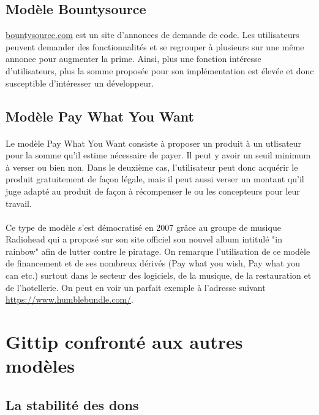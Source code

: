     \subsection{Modèle Bountysource}

\url{bountysource.com} est un site d'annonces de demande de code. Les
utilisateurs peuvent demander des fonctionnalités et se regrouper à plusieurs
sur une même annonce pour augmenter la prime. Ainsi, plus une fonction
intéresse d'utilisateurs, plus la somme proposée pour son implémentation est
élevée et donc susceptible d'intéresser un développeur.

    \subsection{Modèle Pay What You Want}
    
    \paragraph{} Le modèle Pay What You Want consiste à proposer un produit à
    un utlisateur pour la somme qu'il estime nécessaire de payer. Il peut y
    avoir un seuil minimum à verser ou bien non. Dans le deuxième cas,
    l'utilisateur peut donc acquérir le produit gratuitement de façon légale,
    mais il peut aussi verser un montant qu'il juge adapté au produit de façon
    à récompenser le ou les concepteurs pour leur travail.

    \paragraph{} Ce type de modèle s'est démocratisé en 2007 grâce au groupe de
    musique Radiohead qui a proposé sur son site officiel son nouvel album
    intitulé "in rainbow" afin de lutter contre le piratage. On remarque
    l'utilisation de ce modèle de financement et de ses nombreux dérivés (Pay
    what you wish, Pay what you can etc.) surtout dans le secteur des
    logiciels, de la musique, de la restauration et de l'hotellerie. On peut en
    voir un parfait exemple à l'adresse suivant
    \url{https://www.humblebundle.com/}.


\section{Gittip confronté aux autres modèles}

\subsection{La stabilité des dons}

